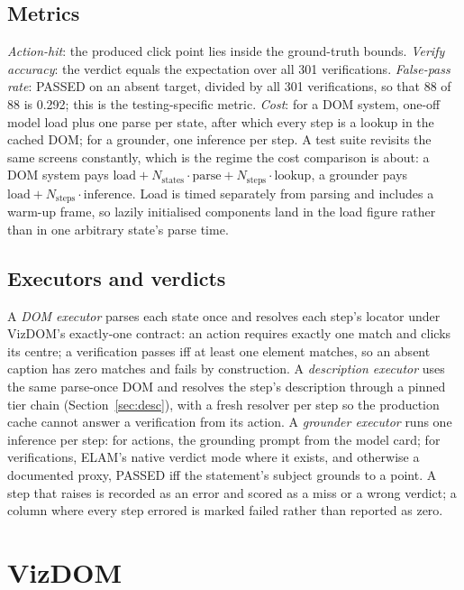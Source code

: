 \documentclass[conference]{IEEEtran}
\begin{document}
\subsection{Metrics}
\emph{Action-hit}: the produced click point lies inside the ground-truth bounds. \emph{Verify accuracy}: the verdict equals the expectation over all 301 verifications. \emph{False-pass rate}: PASSED on an absent target, divided by all 301 verifications, so that 88 of 88 is 0.292; this is the testing-specific metric. \emph{Cost}: for a DOM system, one-off model load plus one parse per state, after which every step is a lookup in the cached DOM; for a grounder, one inference per step. A test suite revisits the same screens constantly, which is the regime the cost comparison is about: a DOM system pays $\text{load} + N_\text{states}\cdot\text{parse} + N_\text{steps}\cdot\text{lookup}$, a grounder pays $\text{load} + N_\text{steps}\cdot\text{inference}$. Load is timed separately from parsing and includes a warm-up frame, so lazily initialised components land in the load figure rather than in one arbitrary state's parse time.

\subsection{Executors and verdicts}
A \emph{DOM executor} parses each state once and resolves each step's locator under VizDOM's exactly-one contract: an action requires exactly one match and clicks its centre; a verification passes iff at least one element matches, so an absent caption has zero matches and fails by construction. A \emph{description executor} uses the same parse-once DOM and resolves the step's description through a pinned tier chain (Section~\ref{sec:desc}), with a fresh resolver per step so the production cache cannot answer a verification from its action. A \emph{grounder executor} runs one inference per step: for actions, the grounding prompt from the model card; for verifications, ELAM's native verdict mode where it exists, and otherwise a documented proxy, PASSED iff the statement's subject grounds to a point. A step that raises is recorded as an error and scored as a miss or a wrong verdict; a column where every step errored is marked failed rather than reported as zero.

\section{VizDOM}
\label{sec:vizdom}
\end{document}

